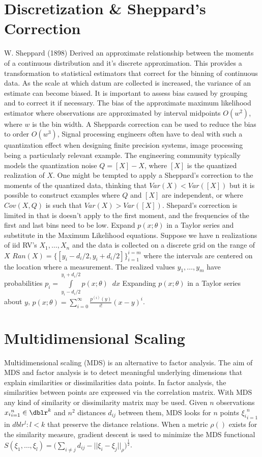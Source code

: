 \section*{Discretization \& Sheppard's Correction}W. Sheppard (1898) Derived an approximate relationship between the moments of a continuous distribution and it's discrete approximation. This provides a transformation to statistical estimators that correct for the binning of continuous data.  As the scale at which datum are collected is increased, the variance of an estimate can become biased.  It is important to assess  bias caused by grouping and to correct it if necessary. The  bias of the approximate maximum likelihood estimator where observations are approximated by interval midpoints $O(w^2)$, where $w$ is the bin width. A Sheppards correction can be used to reduce the bias to order $O(w^3)$,  Signal processing engineers often have to deal with such a quantization effect when designing finite precision systems, image processing being a particularly relevant example. The engineering community typically models the quantization noise $Q=[X]-X$, where $[X]$ is the quantized realization of $X$. One might be tempted to apply a Sheppard's correction to the moments of the quantized data, thinking that $Var(X)<Var([X])$ but it is possible to construct examples where $Q$ and $[X]$ are independent, or where $Cov(X,Q)$ is such that $Var(X)>Var([X])$.  Shepard's correction is limited in that is doesn't apply to the first moment, and the frequencies of the first and last bins need to be low.  Expand $p(x;\theta)$ in a Taylor series and substitute in the Maximum Likelihood equations. \cite{Lindley, D. V. (1950)}  Suppose we have n realizations of iid RV's ${X_1, \hdots , X_n}$ and the data is collected on a discrete grid on the range of $X$ $Ran(X)=\{[y_i-d_i/2,y_i+d_i/2]\}_{i=1}^{i=m}$ where the intervals are centered on the location where a measurement. The realized values ${y_1, \hdots , y_m}$ have probabilities $p_i=\int\limits_{y_i - d_i /2}^{y_i+d_i /2} p(x;\theta) \;\; dx$ Expanding $p(x;\theta)$ in a Taylor series about $y$, $p(x;\theta)= \sum\limits_{i=0}^{\infty} \frac{p^{(i)}(y) }{i!} (x-y)^i$.


\section*{Multidimensional Scaling}Multidimensional scaling (MDS) is an alternative to factor analysis. The aim of MDS and factor analysis is to detect meaningful underlying dimensions that explain similarities or dissimilarities data points. In factor analysis, the similarities between points are expressed via the correlation matrix. With MDS any kind of similarity or dissimilarity matrix may be used.  Given $n$ observations ${x_i}_{i=1}^{n} \in \dblr^k$ and $n^2$ distances $d_{ij}$ between them, MDS looks for $n$ points ${\xi_i}_{i=1}^{n}$ in $dblr^l : l<k$ that preserve the distance relations. When a metric $\rho()$ exists for the similarity measure, gradient descent is used to minimize the MDS functional $S(\xi_1, \ldots , \xi_l)=\biggl( \sum_{i \neq j} d_{ij}-||\xi_i-\xi_j||_{\rho}\biggr)^\frac{1}{2}$.


